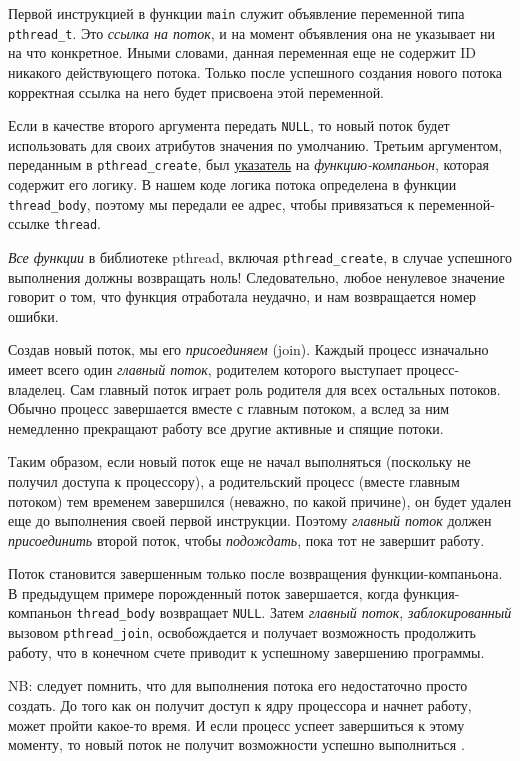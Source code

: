 \documentclass[%
	11pt,
	a4paper,
	utf8,
		]{article}
\begin{document}
Первой инструкцией в функции \verb|main| служит объявление переменной типа \verb|pthread_t|. Это \emph{ссылка на поток}, и на момент объявления она не указывает ни на что конкретное. Иными словами, данная переменная еще не содержит ID никакого действующего потока. Только после успешного создания нового потока корректная ссылка на него будет присвоена этой переменной.

Если в качестве второго аргумента передать \verb|NULL|, то новый поток будет использовать для своих атрибутов значения по умолчанию. Третьим аргументом, переданным в \verb|pthread_create|, был \underline{указатель} на \emph{функцию-компаньон}, которая содержит его логику. В нашем коде логика потока определена в функции \verb|thread_body|, поэтому мы передали ее адрес, чтобы привязаться к переменной-ссылке \verb|thread|. 

\emph{Все функции} в библиотеке pthread, включая \verb|pthread_create|, в случае успешного выполнения должны возвращать ноль! Следовательно, любое ненулевое значение говорит о том, что функция отработала неудачно, и нам возвращается номер ошибки.

Создав новый поток, мы его \emph{присоединяем} (join). Каждый процесс изначально имеет всего один \emph{главный поток}, родителем которого выступает процесс-владелец. Сам главный поток играет роль родителя для всех остальных потоков. Обычно процесс завершается вместе с главным потоком, а вслед за ним немедленно прекращают работу все другие активные и спящие потоки.

Таким образом, если новый поток еще не начал выполняться (поскольку не получил доступа к процессору), а родительский процесс (вместе главным потоком) тем временем завершился (неважно, по какой причине), он будет удален еще до выполнения своей первой инструкции. Поэтому \emph{главный поток} должен \emph{присоединить} второй поток, чтобы \emph{подождать}, пока тот не завершит работу.

Поток становится завершенным только после возвращения функции-компаньона. В предыдущем примере порожденный поток завершается, когда функция-компаньон \verb|thread_body| возвращает \verb|NULL|. Затем \emph{главный поток}, \emph{заблокированный} вызовом \verb|pthread_join|, освобождается и получает возможность продолжить работу, что в конечном счете приводит к успешному завершению программы.

NB: следует помнить, что для выполнения потока его недостаточно просто создать. До того как он получит доступ к ядру процессора и начнет работу, может пройти какое-то время. И если процесс успеет завершиться к этому моменту, то новый поток не получит возможности успешно выполниться \cite[]{amini-extreme-c:2022}.
\end{document}
